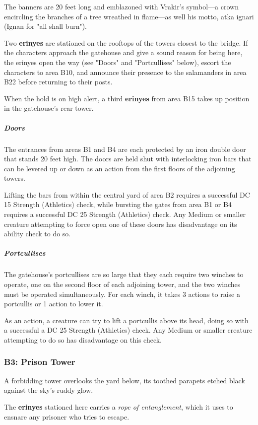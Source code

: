 \documentclass[10pt,a4paper,twoside,bg=print,twocolumn,openany,nodeprecatedcode]{dndbook}
\begin{document}
The banners are 20 feet long and emblazoned with Vrakir's symbol—a crown encircling the branches of a tree wreathed in flame—as well his motto, atka ignari (Ignan for "all shall burn").

Two \textbf{erinyes} are stationed on the rooftops of the towers closest to the bridge. If the characters approach the gatehouse and give a sound reason for being here, the erinyes open the way (see "Doors" and "Portcullises" below), escort the characters to area B10, and announce their presence to the salamanders in area B22 before returning to their posts.

When the hold is on high alert, a third \textbf{erinyes} from area B15 takes up position in the gatehouse's rear tower.

\subparagraph{Doors}
The entrances from areas B1 and B4 are each protected by an iron double door that stands 20 feet high. The doors are held shut with interlocking iron bars that can be levered up or down as an action from the first floors of the adjoining towers.

Lifting the bars from within the central yard of area B2 requires a successful DC 15 Strength (Athletics) check, while bursting the gates from area B1 or B4 requires a successful DC 25 Strength (Athletics) check. Any Medium or smaller creature attempting to force open one of these doors has disadvantage on its ability check to do so.

\subparagraph{Portcullises}
The gatehouse's portcullises are so large that they each require two winches to operate, one on the second floor of each adjoining tower, and the two winches must be operated simultaneously. For each winch, it takes 3 actions to raise a portcullis or 1 action to lower it.

As an action, a creature can try to lift a portcullis above its head, doing so with a successful a DC 25 Strength (Athletics) check. Any Medium or smaller creature attempting to do so has disadvantage on this check.

\subsubsection{B3: Prison Tower}
\begin{DndReadAloud}{}
A forbidding tower overlooks the yard below, its toothed parapets etched black against the sky's ruddy glow.

\end{DndReadAloud}

The \textbf{erinyes} stationed here carries a \textit{rope of entanglement}, which it uses to ensnare any prisoner who tries to escape.
\end{document}
